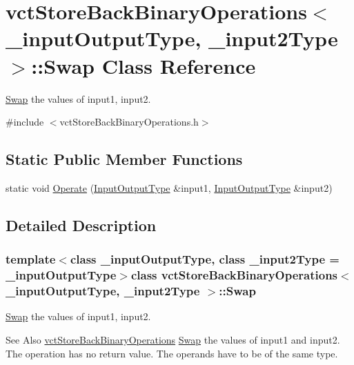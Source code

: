 \hypertarget{classvct_store_back_binary_operations_1_1_swap}{\section{vct\-Store\-Back\-Binary\-Operations$<$ \-\_\-input\-Output\-Type, \-\_\-input2\-Type $>$\-:\-:Swap Class Reference}
\label{classvct_store_back_binary_operations_1_1_swap}
}


\hyperlink{classvct_store_back_binary_operations_1_1_swap}{Swap} the values of input1, input2.  




{\ttfamily \#include $<$vct\-Store\-Back\-Binary\-Operations.\-h$>$}

\subsection*{Static Public Member Functions}
\begin{DoxyCompactItemize}
\item 
static void \hyperlink{classvct_store_back_binary_operations_1_1_swap_a43e027b4bc4c1cceed2cc171c592c6f1}{Operate} (\hyperlink{classvct_store_back_binary_operations_a9dc481d9e1345541dd5d833d5e5688f3}{Input\-Output\-Type} \&input1, \hyperlink{classvct_store_back_binary_operations_a9dc481d9e1345541dd5d833d5e5688f3}{Input\-Output\-Type} \&input2)
\end{DoxyCompactItemize}


\subsection{Detailed Description}
\subsubsection*{template$<$class \-\_\-input\-Output\-Type, class \-\_\-input2\-Type = \-\_\-input\-Output\-Type$>$class vct\-Store\-Back\-Binary\-Operations$<$ \-\_\-input\-Output\-Type, \-\_\-input2\-Type $>$\-::\-Swap}

\hyperlink{classvct_store_back_binary_operations_1_1_swap}{Swap} the values of input1, input2. 

\begin{DoxySeeAlso}{See Also}
\hyperlink{classvct_store_back_binary_operations}{vct\-Store\-Back\-Binary\-Operations} \hyperlink{classvct_store_back_binary_operations_1_1_swap}{Swap} the values of input1 and input2. The operation has no return value. The operands have to be of the same type. 
\end{DoxySeeAlso}


